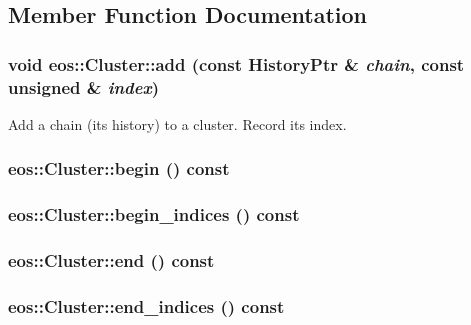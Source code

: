 \subsection{Member Function Documentation}
\hypertarget{classeos_1_1Cluster_afed737aab746ba8e3c8fefcf32ea185d}{
\subsubsection[{add}]{\setlength{\rightskip}{0pt plus 5cm}void eos::Cluster::add (const {\bf HistoryPtr} \& {\em chain}, \/  const unsigned \& {\em index})}}
\label{classeos_1_1Cluster_afed737aab746ba8e3c8fefcf32ea185d}
Add a chain (its history) to a cluster. Record its index. \hypertarget{classeos_1_1Cluster_a07f3b9298b4ea870313f62cce1b9807c}{
\subsubsection[{begin}]{ eos::Cluster::begin () const}}
\label{classeos_1_1Cluster_a07f3b9298b4ea870313f62cce1b9807c}
\hypertarget{classeos_1_1Cluster_a81ba073f1dc0d91e0fd0b3060f6cd12d}{
\subsubsection[{begin\_\-indices}]{ eos::Cluster::begin\_\-indices () const}}
\label{classeos_1_1Cluster_a81ba073f1dc0d91e0fd0b3060f6cd12d}
\hypertarget{classeos_1_1Cluster_a7269794a3f029fb51e08ae51faf5e67f}{
\subsubsection[{end}]{ eos::Cluster::end () const}}
\label{classeos_1_1Cluster_a7269794a3f029fb51e08ae51faf5e67f}
\hypertarget{classeos_1_1Cluster_a346a8e945ea0be679c9eb372e589619b}{
\subsubsection[{end\_\-indices}]{ eos::Cluster::end\_\-indices () const}}
